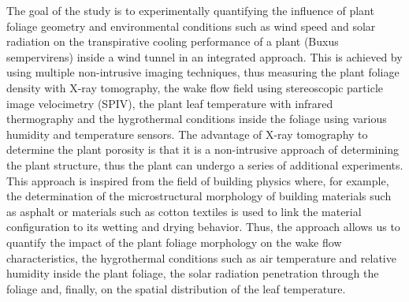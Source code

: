 
The goal of the study is to experimentally quantifying the influence of plant foliage geometry and environmental conditions such as wind speed and solar radiation on the transpirative cooling performance of a plant (Buxus sempervirens) inside a wind tunnel in an integrated approach. This is achieved by using multiple non-intrusive imaging techniques, thus measuring the plant foliage density with X-ray tomography, the wake flow field using stereoscopic particle image velocimetry (SPIV), the plant leaf temperature with infrared thermography and the hygrothermal conditions inside the foliage using various humidity and temperature sensors. The advantage of X-ray tomography to determine the plant porosity is that it is a non-intrusive approach of determining the plant structure, thus the plant can undergo a series of additional experiments. This approach is inspired from the field of building physics where, for example, the determination of the microstructural morphology of building materials such as asphalt \citep{Lal2016,Lal2017} or materials such as cotton textiles \citep{Parada2017} is used to link the material configuration to its wetting and drying behavior. Thus, the approach allows us to quantify the impact of the plant foliage morphology on the wake flow characteristics, the hygrothermal conditions such as air temperature and relative humidity inside the plant foliage, the solar radiation penetration through the foliage and, finally, on the spatial distribution of the leaf temperature. 

